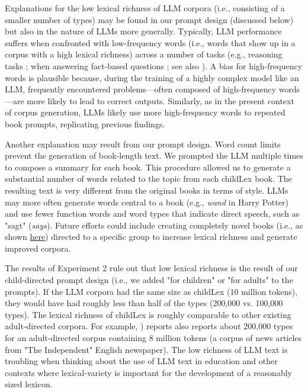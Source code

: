 \documentclass[doc, a4paper]{apa7}
\begin{document}
Explanations for the low lexical richness of LLM corpora (i.e., consisting of a smaller number of types) may be found in our prompt design (discussed below) but also in the nature of LLMs more generally. Typically, LLM performance suffers when confronted with low-frequency words (i.e., words that show up in a corpus with a high lexical richness) across a number of tasks (e.g., reasoning tasks \cite{razeghi_impact_2022}; when answering fact-based questions \cite{kandpal_large_2023}; see also \citep{oh_frequency_2024}). A bias for high-frequency words is plausible because, during the training of a highly complex model like an LLM, frequently encountered problems—often composed of high-frequency words—are more likely to lead to correct outputs. Similarly, as in the present context of corpus generation, LLMs likely use more high-frequency words to repeated book prompts, replicating previous findings. 

Another explanation may result from our prompt design. Word count limits prevent the generation of book-length text. We prompted the LLM multiple times to compose a summary for each book. This procedure allowed us to generate a substantial number of words related to the topic from each childLex book. The resulting text is very different from the original books in terms of style. LLMs may more often generate words central to a book (e.g., \textit{wand} in Harry Potter) and use fewer function words and word types that indicate direct speech, such as "sagt" (\textit{says}). Future efforts could include creating completely novel books (i.e., as shown \href{https://medium.com/@baen2810/ai-assisted-writing-of-a-book-cataclysm-67788412fb31}{here}) directed to a specific group to increase lexical richness and generate improved corpora. 

The results of Experiment 2 rule out that low lexical richness is the result of our child-directed prompt design (i.e., we added "for children" or "for adults" to the prompts). If the LLM corpora had the same size as childLex (10 million tokens), they would have had roughly less than half of the types (200,000 vs. 100,000 types). The lexical richness of childLex is roughly comparable to other existing adult-directed corpora. For example, \citet{baayen_word_2001}) reports also reports about 200,000 types for an adult-directed corpus containing 8 million tokens (a corpus of news articles from "The Independent" English newspaper). The low richness of LLM text is troubling when thinking about the use of LLM text in education \citep[see also ][]{kasneci_chatgpt_2023} and other contexts where lexical-variety is important for the development of a reasonably sized lexicon. 
\end{document}
